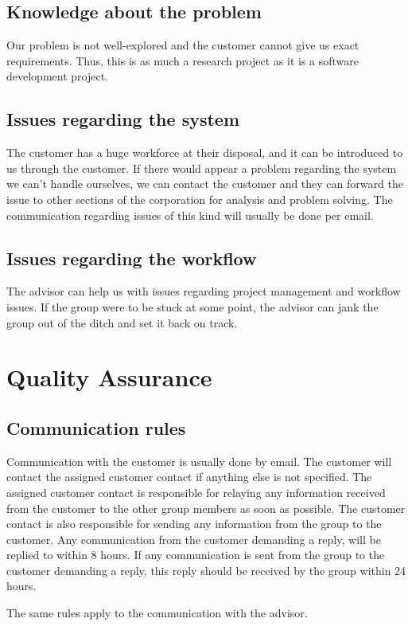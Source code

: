 \subsection{Knowledge about the problem}
Our problem is not well-explored and the customer cannot give us exact requirements. Thus, this is as much a research project as it is a software development project.

\subsection{Issues regarding  the system}
The customer has a huge workforce at their disposal, and it can be introduced to us through the customer. If there would appear a problem regarding the system we can’t handle ourselves, we can contact the customer and they can forward the issue to other sections of the corporation for analysis and problem solving. The communication regarding issues of this kind will usually be done per email. 

\subsection{Issues regarding the workflow}
The advisor can help us with issues regarding project management and workflow issues. If the group were to be stuck at some point, the advisor can jank the group out of the ditch and set it back on track. 

\section{Quality Assurance}
\subsection{Communication rules}
Communication with the customer is usually done by email. The customer will contact the assigned customer contact if anything else is not specified. The assigned customer contact is responsible for relaying any information received from the customer to the other group members as soon as possible. The customer contact is also responsible for sending any information from the group to the customer. Any communication from the customer demanding a reply, will be replied to within 8 hours. If any communication is sent from the group to the customer demanding a reply, this reply should be received by the group within 24 hours.

The same rules apply to the communication with the advisor.

